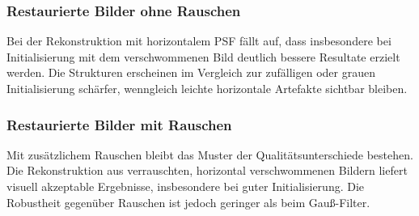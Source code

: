 \subsubsection{Restaurierte Bilder ohne Rauschen}

Bei der Rekonstruktion mit horizontalem PSF fällt auf, dass insbesondere bei Initialisierung mit dem verschwommenen Bild deutlich bessere Resultate erzielt werden. Die Strukturen erscheinen im Vergleich zur zufälligen oder grauen Initialisierung schärfer, wenngleich leichte horizontale Artefakte sichtbar bleiben.

\noindent
\begin{minipage}[t]{0.33\textwidth}
\end{minipage}
%
\begin{minipage}[t]{0.33\textwidth}
\end{minipage}
%
\begin{minipage}[t]{0.33\textwidth}
\end{minipage}


\subsubsection{Restaurierte Bilder mit Rauschen}

Mit zusätzlichem Rauschen bleibt das Muster der Qualitätsunterschiede bestehen. Die Rekonstruktion aus verrauschten, horizontal verschwommenen Bildern liefert visuell akzeptable Ergebnisse, insbesondere bei guter Initialisierung. Die Robustheit gegenüber Rauschen ist jedoch geringer als beim Gauß-Filter.

\noindent
\begin{minipage}[t]{0.33\textwidth}
\end{minipage}
%
\begin{minipage}[t]{0.33\textwidth}
\end{minipage}
%
\begin{minipage}[t]{0.33\textwidth}
\end{minipage}

